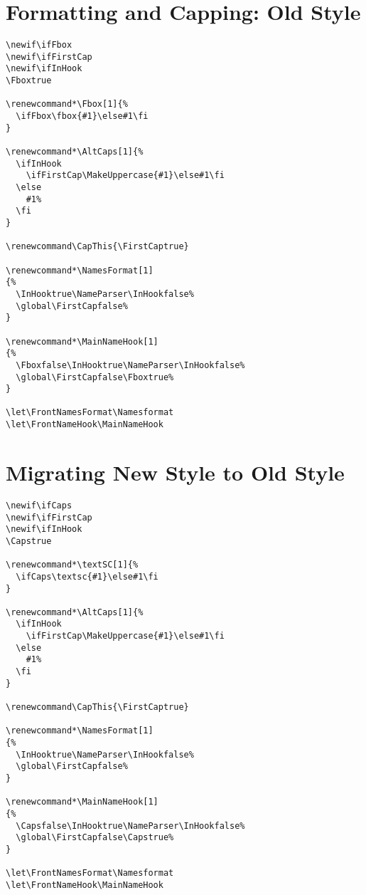 \documentclass{article}
\begin{document}
\section{Formatting and Capping: Old Style}
\begin{verbatim}
\newif\ifFbox
\newif\ifFirstCap
\newif\ifInHook
\Fboxtrue

\renewcommand*\Fbox[1]{%
  \ifFbox\fbox{#1}\else#1\fi
}

\renewcommand*\AltCaps[1]{%
  \ifInHook
    \ifFirstCap\MakeUppercase{#1}\else#1\fi
  \else
    #1%
  \fi
}

\renewcommand\CapThis{\FirstCaptrue}

\renewcommand*\NamesFormat[1]
{%
  \InHooktrue\NameParser\InHookfalse%
  \global\FirstCapfalse%
}

\renewcommand*\MainNameHook[1]
{%
  \Fboxfalse\InHooktrue\NameParser\InHookfalse%
  \global\FirstCapfalse\Fboxtrue%
}

\let\FrontNamesFormat\Namesformat
\let\FrontNameHook\MainNameHook
\end{verbatim}
\clearpage

\section{Migrating New Style to Old Style}
\begin{verbatim}
\newif\ifCaps
\newif\ifFirstCap
\newif\ifInHook
\Capstrue

\renewcommand*\textSC[1]{%
  \ifCaps\textsc{#1}\else#1\fi
}

\renewcommand*\AltCaps[1]{%
  \ifInHook
    \ifFirstCap\MakeUppercase{#1}\else#1\fi
  \else
    #1%
  \fi
}

\renewcommand\CapThis{\FirstCaptrue}

\renewcommand*\NamesFormat[1]
{%
  \InHooktrue\NameParser\InHookfalse%
  \global\FirstCapfalse%
}

\renewcommand*\MainNameHook[1]
{%
  \Capsfalse\InHooktrue\NameParser\InHookfalse%
  \global\FirstCapfalse\Capstrue%
}

\let\FrontNamesFormat\Namesformat
\let\FrontNameHook\MainNameHook
\end{verbatim}
\end{document}

